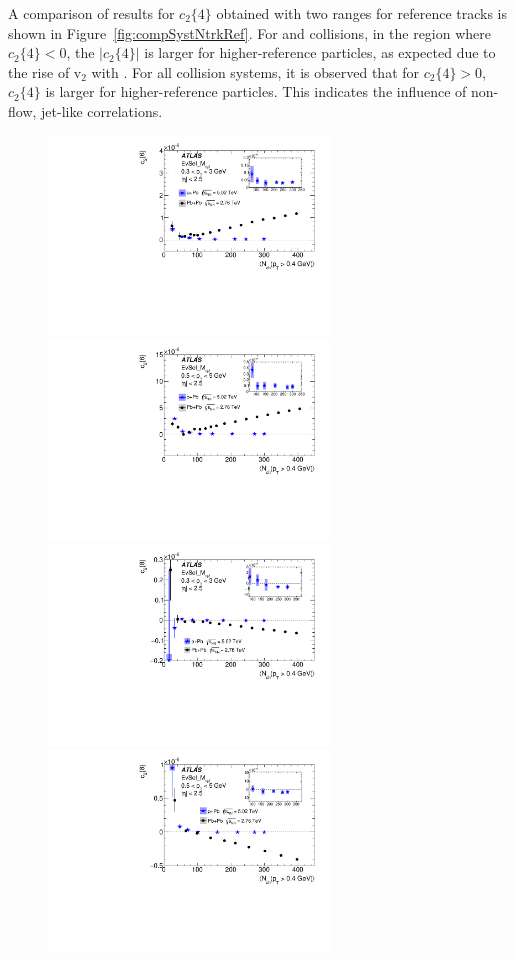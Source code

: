 \documentclass[cernpreprint,texlive=2014,txfonts,UKenglish]{latex/atlasdoc}
\begin{document}
A comparison of results for $c_2\{4\}$ obtained with two \pT ranges for reference tracks is shown in Figure~\ref{fig:compSystNtrkRef}. For \pPb and \PbPb collisions, in the region where $c_2\{4\} < 0$, the $|c_2\{4\}|$ is larger for higher-\pT reference particles, as expected due to the rise of $\mathrm{v}_2$ with \pT. For all collision systems, it is observed that for  $c_2\{4\} > 0$,  $c_2\{4\}$ is larger for higher-\pT reference particles. This indicates the influence of non-flow, jet-like correlations.
\begin{figure}[ht!]
\begin{center}
\includegraphics[width=75mm]{fig_08a.pdf}
\includegraphics[width=75mm]{fig_08b.pdf}
\includegraphics[width=75mm]{fig_08c.pdf}
\includegraphics[width=75mm]{fig_08d.pdf}

\end{center}
\end{figure}
\end{document}
